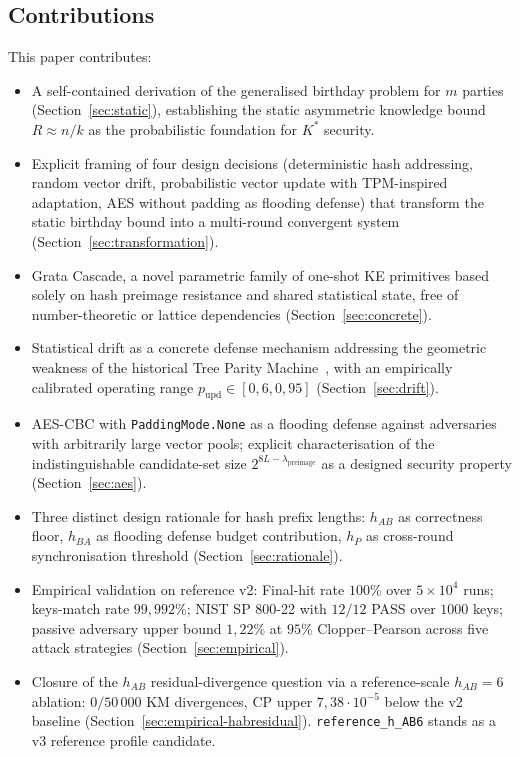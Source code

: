 \documentclass[11pt,a4paper]{article}
\begin{document}
\subsection{Contributions}\label{sec:contributions}

This paper contributes:
\begin{itemize}[leftmargin=*]
\item A self-contained derivation of the generalised birthday problem for $m$ parties (Section~\ref{sec:static}), establishing the static asymmetric knowledge bound $R \approx n/k$ as the probabilistic foundation for $K^*$ security.
\item Explicit framing of four design decisions (deterministic hash addressing, random vector drift, probabilistic vector update with TPM-inspired adaptation, AES without padding as flooding defense) that transform the static birthday bound into a multi-round convergent system (Section~\ref{sec:transformation}).
\item Grata Cascade, a novel parametric family of one-shot KE primitives based solely on hash preimage resistance and shared statistical state, free of number-theoretic or lattice dependencies (Section~\ref{sec:concrete}).
\item Statistical drift as a concrete defense mechanism addressing the geometric weakness of the historical Tree Parity Machine~\cite{KMS2003}, with an empirically calibrated operating range $p_\text{upd} \in [0{,}6, 0{,}95]$ (Section~\ref{sec:drift}).
\item AES-CBC with \texttt{PaddingMode.None} as a flooding defense against adversaries with arbitrarily large vector pools; explicit characterisation of the indistinguishable candidate-set size $2^{8L - \lambda_\text{preimage}}$ as a designed security property (Section~\ref{sec:aes}).
\item Three distinct design rationale for hash prefix lengths: $h_{AB}$ as correctness floor, $h_{BA}$ as flooding defense budget contribution, $h_P$ as cross-round synchronisation threshold (Section~\ref{sec:rationale}).
\item Empirical validation on reference v2: Final-hit rate $100\%$ over $5 \times 10^4$ runs; keys-match rate $99{,}992\%$; NIST SP 800-22 with $12/12$ PASS over $1000$ keys; passive adversary upper bound $1{,}22\%$ at $95\%$ Clopper--Pearson across five attack strategies (Section~\ref{sec:empirical}).
\item Closure of the $h_{AB}$ residual-divergence question via a reference-scale $h_{AB} = 6$ ablation: $0/50\,000$ KM divergences, CP upper $7{,}38 \cdot 10^{-5}$ below the v2 baseline (Section~\ref{sec:empirical-habresidual}). \texttt{reference\_h\_AB6} stands as a v3 reference profile candidate.

\end{itemize}
\end{document}
